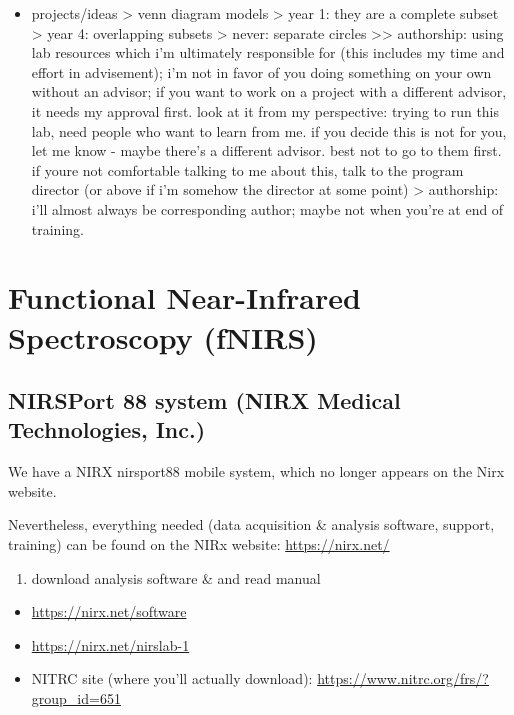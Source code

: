 \documentclass[
]{book}
\providecommand{\tightlist}{%
  \setlength{\itemsep}{0pt}\setlength{\parskip}{0pt}}
\begin{document}
\begin{itemize}
\tightlist
\item
  projects/ideas
  \textgreater{} venn diagram models
  \textgreater{} year 1: they are a complete subset
  \textgreater{} year 4: overlapping subsets
  \textgreater{} never: separate circles
  \textgreater\textgreater{} authorship: using lab resources which i'm ultimately responsible for (this includes my time and effort in advisement); i'm not in favor of you doing something on your own without an advisor; if you want to work on a project with a different advisor, it needs my approval first. look at it from my perspective: trying to run this lab, need people who want to learn from me. if you decide this is not for you, let me know - maybe there's a different advisor. best not to go to them first. if youre not comfortable talking to me about this, talk to the program director (or above if i'm somehow the director at some point)
  \textgreater{} authorship: i'll almost always be corresponding author; maybe not when you're at end of training.
\end{itemize}

\hypertarget{functional-near-infrared-spectroscopy-fnirs}{%
\chapter{Functional Near-Infrared Spectroscopy (fNIRS)}\label{functional-near-infrared-spectroscopy-fnirs}}

\hypertarget{nirsport-88-system-nirx-medical-technologies-inc.}{%
\section{NIRSPort 88 system (NIRX Medical Technologies, Inc.)}\label{nirsport-88-system-nirx-medical-technologies-inc.}}

We have a NIRX nirsport88 mobile system, which no longer appears on the Nirx website.

Nevertheless, everything needed (data acquisition \& analysis software, support, training) can be found on the NIRx website:
\url{https://nirx.net/}

\begin{enumerate}
\def\labelenumi{\arabic{enumi}.}
\tightlist
\item
  download analysis software \& and read manual
\end{enumerate}

\begin{itemize}
\tightlist
\item
  \url{https://nirx.net/software}
\item
  \url{https://nirx.net/nirslab-1}
\item
  NITRC site (where you'll actually download): \url{https://www.nitrc.org/frs/?group_id=651}
\end{itemize}
\end{document}
